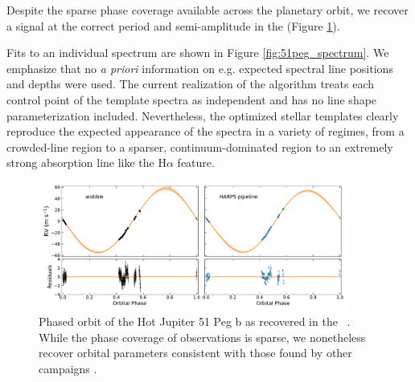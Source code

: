 \documentclass[modern]{aastex62}
\begin{document}
Despite the sparse phase coverage available across the planetary orbit, we recover a signal at the correct period and semi-amplitude in the \RVs (Figure \ref{fig:51peg_planet}). 

Fits to an individual spectrum are shown in Figure \ref{fig:51peg_spectrum}.
We emphasize that no \textit{a priori} information on e.g. expected spectral line positions and depths were used.
The current realization of the \wobble algorithm treats each control point of the template spectra as independent and has no line shape parameterization included.
Nevertheless, the optimized stellar templates clearly reproduce the expected appearance of the spectra in a variety of regimes, from a crowded-line region to a sparser, continuum-dominated region to an extremely strong absorption line like the H$\alpha$ feature.

\begin{figure}
\centering
\includegraphics[width=4in]{51peg_planet}
\caption{Phased orbit of the Hot Jupiter 51 Peg b as recovered in the \wobble\ \RVs. While the phase coverage of \HARPS observations is sparse, we nonetheless recover orbital parameters consistent with those found by other \RV campaigns .  }
\label{fig:51peg_planet}
\end{figure}
\end{document}
